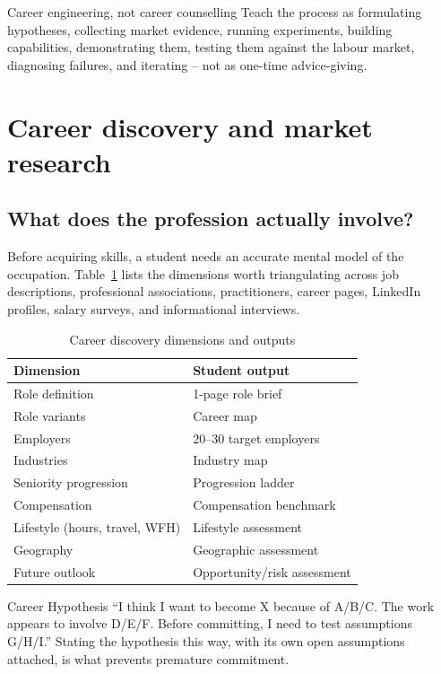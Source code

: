 \documentclass{reportkit}
\begin{document}
\begin{principle}{Career engineering, not career counselling}
Teach the process as formulating hypotheses, collecting market evidence, running
experiments, building capabilities, demonstrating them, testing them against the
labour market, diagnosing failures, and iterating -- not as one-time advice-giving.
\end{principle}

\section{Career discovery and market research}

\subsection{What does the profession actually involve?}
Before acquiring skills, a student needs an accurate mental model of the occupation.
Table~\ref{tab:discovery} lists the dimensions worth triangulating across job
descriptions, professional associations, practitioners, career pages, LinkedIn
profiles, salary surveys, and informational interviews.

\begin{table}[H]
\caption{Career discovery dimensions and outputs}
\label{tab:discovery}
\centering
\begin{tabular}{ll}
\toprule
Dimension & Student output \\
\midrule
Role definition & 1-page role brief \\
Role variants & Career map \\
Employers & 20--30 target employers \\
Industries & Industry map \\
Seniority progression & Progression ladder \\
Compensation & Compensation benchmark \\
Lifestyle (hours, travel, WFH) & Lifestyle assessment \\
Geography & Geographic assessment \\
Future outlook & Opportunity/risk assessment \\
\bottomrule
\end{tabular}
\end{table}

\begin{deliverablenote}{Career Hypothesis}
``I think I want to become X because of A/B/C. The work appears to involve D/E/F.
Before committing, I need to test assumptions G/H/I.'' Stating the hypothesis this
way, with its own open assumptions attached, is what prevents premature commitment.
\end{deliverablenote}
\end{document}
